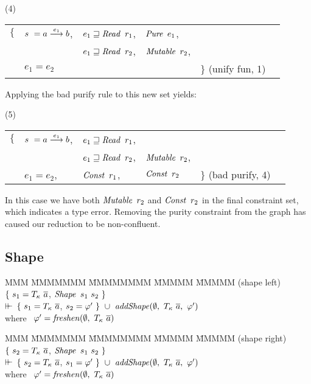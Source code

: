 \qq (4) \quad
\begin{tabular}{llllll}
	$\{$
	& $s \ = a \stackrel{e_1}{\longrightarrow} b$,	& $e_1 \sqsupseteq \operatorname{\mathit{Read}} \ r_1$, 	& $\iPure \ e_1$, \\
	& 	 			& $e_1 \sqsupseteq \operatorname{\mathit{Read}} \ r_2$, 	& $\iMutable \ r_2$, \\
	& $e_1 = e_2$ 			& 			&	
	& $\}$ \qq (unify fun, 1)
\end{tabular}
\bigskip

Applying the bad purify rule to this new set yields:

\qq (5) \quad
\begin{tabular}{llllll}
	$\{$
	& $s \ = a \stackrel{e_1}{\longrightarrow} b$,	& $e_1 \sqsupseteq \operatorname{\mathit{Read}} \ r_1$, 	& \\
	& 	 			& $e_1 \sqsupseteq \operatorname{\mathit{Read}} \ r_2$, 	& $\iMutable \ r_2$, \\
	& $e_1 = e_2$,			& $\iConst \ r_1$,		& $\iConst \ r_2$ 
	& $\}$ \qq (bad purify, 4)
\end{tabular}
\bigskip

In this case we have both $\iMutable \ r_2$ and $\iConst \ r_2$ in the final constraint set, which indicates a type error. Removing the purity constraint from the graph has caused our reduction to be non-confluent. 


\subsection{Shape}

\begin{tabbing}
	MMM \= MMMMMMM \= MMMMMMMM \= MMMMM \= MMMMM \kill
	\> (shape left)	\> $\{ \ s_1 = T_{\kappa} \ \overline{a}$, 
			\> $\operatorname{\mathit{Shape}} \ s_1 \ s_2 \ \}$
	\\[1ex]
	\> \qq $\vdash\mkern-6mu\vdash$
			\> $\{ \ s_1 = T_{\kappa} \ \overline{a}$,
			\> $s_2 = \varphi' \ \} \ \cup \ 
				\iaddShape (\emptyset, \ T_{\kappa} \ \ov{a}, \ \varphi') $ 
	\\[1ex]
	\> 		\> where \ $\varphi' = \ifreshen(\emptyset, \ T_{\kappa} \ \ov{a})$
\end{tabbing}

\begin{tabbing}
	MMM \= MMMMMMM \= MMMMMMMM \= MMMMM \= MMMMM \kill
	\> (shape right) \> $\{ \ s_2 = T_{\kappa} \ \overline{a}$, 
			 \> $\operatorname{\mathit{Shape}} \ s_1 \ s_2 \ \}$
	\\[1ex]
	\> \qq $\vdash\mkern-6mu\vdash$
			\> $\{ \ s_2 = T_{\kappa} \ \overline{a}$,
			\> $s_1 = \varphi' \ \} \ \cup \ 
				\iaddShape (\emptyset, \ T_{\kappa} \ \ov{a}, \ \varphi')$ 
	\\[1ex]
	\> 		\> where \ $\varphi' = \ifreshen(\emptyset, \ T_{\kappa} \ \ov{a})$
\end{tabbing}

